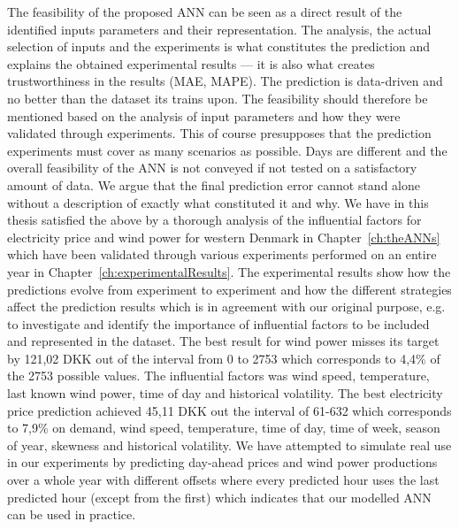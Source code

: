 The feasibility of the proposed ANN can be seen as a direct result of the identified inputs parameters and their representation. The analysis, the actual selection of inputs and the experiments is what constitutes the prediction and explains the obtained experimental results --- it is also what creates trustworthiness in the results (MAE, MAPE). The prediction is data-driven and no better than the dataset its trains upon. The feasibility should therefore be mentioned based on the analysis of input parameters and how they were validated through experiments. This of course presupposes that the prediction experiments must cover as many scenarios as possible. Days are different and the overall feasibility of the ANN is not conveyed if not tested on a satisfactory amount of data. We argue that the final prediction error cannot stand alone without a description of exactly what constituted it and why. We have in this thesis satisfied the above by a thorough analysis of the influential factors for electricity price and wind power for western Denmark in Chapter~\ref{ch:theANNs} which have been validated through various experiments performed on an entire year in Chapter~\ref{ch:experimentalResults}. The experimental results show how the predictions evolve from experiment to experiment and how the different strategies affect the prediction results which is in agreement with our original purpose, e.g. to investigate and identify the importance of influential factors to be included and represented in the dataset. The best result for wind power misses its target by 121,02 DKK out of the interval from 0 to 2753 which corresponds to 4,4\% of the 2753 possible values. The influential factors was wind speed, temperature, last known wind power, time of day and historical volatility. The best electricity price prediction achieved 45,11 DKK out the interval of 61-632 which corresponds to 7,9\% on demand, wind speed, temperature, time of day, time of week, season of year, skewness and historical volatility. We have attempted to simulate real use in our experiments by predicting day-ahead prices and wind power productions over a whole year with different offsets where every predicted hour uses the last predicted hour (except from the first) which indicates that our modelled ANN can be used in practice.

 
